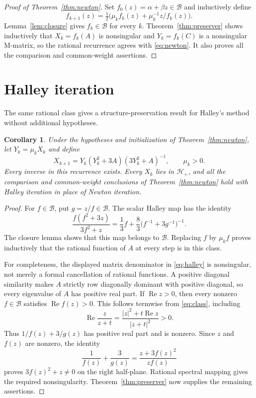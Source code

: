 \documentclass[11pt]{article}
\newtheorem{corollary}[theorem]{Corollary}
\begin{document}
\begin{proof}[Proof of Theorem~\ref{thm:newton}]
Set $f_0(z)=\alpha+\beta z\in\mathcal B$ and inductively define
\[
f_{k+1}(z)=\tfrac12\bigl(\mu_k f_k(z)+\mu_k^{-1}z/f_k(z)\bigr).
\]
Lemma~\ref{lem:closure} gives $f_k\in\mathcal B$ for every $k$. Theorem~\ref{thm:preserver} shows inductively that $X_k=f_k(A)$ is nonsingular and $Y_k=f_k(C)$ is a nonsingular M-matrix, so the rational recurrence agrees with \eqref{eq:newton}. It also proves all the comparison and common-weight assertions.
\end{proof}

\section{Halley iteration}
The same rational class gives a structure-preservation result for Halley's method without additional hypotheses.
\begin{corollary}\label{cor:halley}
Under the hypotheses and initialization of Theorem~\ref{thm:newton}, let $Y_k=\mu_kX_k$ and define
\begin{equation}\label{eq:halley}
X_{k+1}=Y_k(Y_k^2+3A)(3Y_k^2+A)^{-1},\qquad \mu_k>0.
\end{equation}
Every inverse in this recurrence exists. Every $X_k$ lies in $\mathcal H_+$, and all the comparison and common-weight conclusions of Theorem~\ref{thm:newton} hold with Halley iteration in place of Newton iteration.
\end{corollary}
\begin{proof}
For $f\in\mathcal B$, put $g=z/f\in\mathcal B$. The scalar Halley map has the identity
\[
\frac{f(f^2+3z)}{3f^2+z}
=\frac13f+\frac83\bigl(f^{-1}+3g^{-1}\bigr)^{-1}.
\]
The closure lemma shows that this map belongs to $\mathcal B$. Replacing $f$ by $\mu_k f$ proves inductively that the rational function of $A$ at every step is in this class.

For completeness, the displayed matrix denominator in \eqref{eq:halley} is nonsingular, not merely a formal cancellation of rational functions. A positive diagonal similarity makes $A$ strictly row diagonally dominant with positive diagonal, so every eigenvalue of $A$ has positive real part. If $\operatorname{Re}z>0$, then every nonzero $f\in\mathcal B$ satisfies $\operatorname{Re}f(z)>0$. This follows termwise from \eqref{eq:class}, including
\[
\operatorname{Re}\frac{z}{z+t}
=\frac{|z|^2+t\operatorname{Re}z}{|z+t|^2}>0.
\]
Thus $1/f(z)+3/g(z)$ has positive real part and is nonzero. Since $z$ and $f(z)$ are nonzero, the identity
\[
\frac{1}{f(z)}+\frac{3}{g(z)}=\frac{z+3f(z)^2}{zf(z)}
\]
proves $3f(z)^2+z\ne0$ on the right half-plane. Rational spectral mapping gives the required nonsingularity. Theorem~\ref{thm:preserver} now supplies the remaining assertions.
\end{proof}
\end{document}
